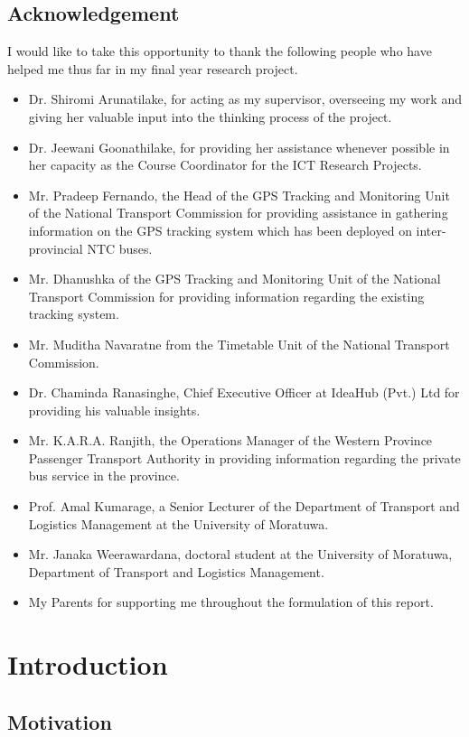 \documentclass[12pt, oneside]{report}
\begin{document}
\section*{Acknowledgement}
I would like to take this opportunity to thank the following people who have helped me thus far in my final year research project.
\begin{itemize}
\item Dr. Shiromi Arunatilake, for acting as my supervisor, overseeing my work and giving her valuable input into the thinking process of the project.
\item Dr. Jeewani Goonathilake, for providing her assistance whenever possible in her capacity as the Course Coordinator for the ICT Research Projects.
\item Mr. Pradeep Fernando, the Head of the GPS Tracking and Monitoring Unit of the National Transport Commission for providing assistance in gathering information on the GPS tracking system which has been deployed on inter-provincial NTC buses.
\item Mr. Dhanushka of the GPS Tracking and Monitoring Unit of the National Transport Commission for providing information regarding the existing tracking system.
\item Mr. Muditha Navaratne from the Timetable Unit of the National Transport Commission.
\item Dr. Chaminda Ranasinghe, Chief Executive Officer at IdeaHub (Pvt.) Ltd for providing his valuable insights.
\item Mr. K.A.R.A. Ranjith, the Operations Manager of the Western Province Passenger Transport Authority in providing information regarding the private bus service in the province.
\item Prof. Amal Kumarage, a Senior Lecturer of the Department of Transport and Logistics Management at the University of Moratuwa.
\item Mr. Janaka Weerawardana, doctoral student at the University of Moratuwa, Department of Transport and Logistics Management.
\item My Parents for supporting me throughout the formulation of this report.
\end{itemize}


\chapter{Introduction}
\label{chapter-Introduction}

\section{Motivation}
\label{section-Motivation}
\end{document}
